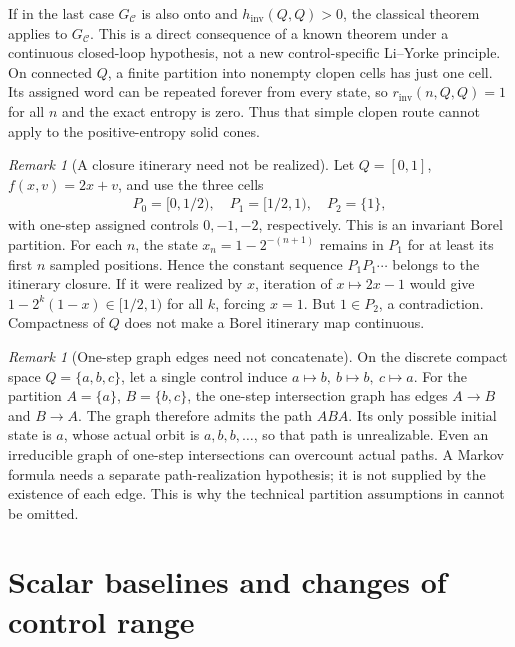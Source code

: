 \documentclass[11pt,a4paper]{article}
\theoremstyle{definition}
\theoremstyle{remark}
\newtheorem{remark}[theorem]{Remark}
\begin{document}
If in the last case \(G_{\mathcal C}\) is also onto and \(h_{\mathrm{inv}}(Q,Q)>0\), the classical theorem \cite{BGKM} applies to \(G_{\mathcal C}\). This is a direct consequence of a known theorem under a continuous closed-loop hypothesis, not a new control-specific Li--Yorke principle. On connected \(Q\), a finite partition into nonempty clopen cells has just one cell. Its assigned word can be repeated forever from every state, so \(r_{\mathrm{inv}}(n,Q,Q)=1\) for all \(n\) and the exact entropy is zero. Thus that simple clopen route cannot apply to the positive-entropy solid cones.

\begin{remark}[A closure itinerary need not be realized]\label{rem:unrealized}
Let \(Q=[0,1]\), \(f(x,v)=2x+v\), and use the three cells
\begin{align*}
 P_0=[0,1/2),\quad P_1=[1/2,1),\quad P_2=\{1\},
\end{align*}
with one-step assigned controls \(0,-1,-2\), respectively. This is an invariant Borel partition. For each \(n\), the state \(x_n=1-2^{-(n+1)}\) remains in \(P_1\) for at least its first \(n\) sampled positions. Hence the constant sequence \(P_1P_1\cdots\) belongs to the itinerary closure. If it were realized by \(x\), iteration of \(x\mapsto2x-1\) would give
\(1-2^k(1-x)\in[1/2,1)\) for all \(k\), forcing \(x=1\). But \(1\in P_2\), a contradiction. Compactness of \(Q\) does not make a Borel itinerary map continuous.
\end{remark}

\begin{remark}[One-step graph edges need not concatenate]\label{rem:graph}
On the discrete compact space \(Q=\{a,b,c\}\), let a single control induce
\(a\mapsto b,\ b\mapsto b,\ c\mapsto a\).
For the partition \(A=\{a\}\), \(B=\{b,c\}\), the one-step intersection graph has edges \(A\to B\) and \(B\to A\). The graph therefore admits the path \(ABA\). Its only possible initial state is \(a\), whose actual orbit is \(a,b,b,\ldots\), so that path is unrealizable. Even an irreducible graph of one-step intersections can overcount actual paths. A Markov formula needs a separate path-realization hypothesis; it is not supplied by the existence of each edge. This is why the technical partition assumptions in \cite{ZHZ2023,YCYZ2025} cannot be omitted.
\end{remark}

\section{Scalar baselines and changes of control range}\label{app:scalar}
\end{document}
